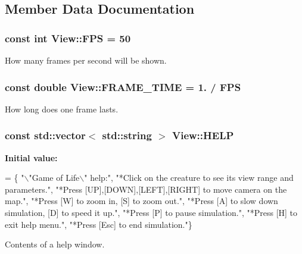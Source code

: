\subsection{Member Data Documentation}
\hypertarget{class_view_ac4811bd9d7b2887fb16bbc182338f2ce}{}
\subsubsection[{F\+P\+S}]{\setlength{\rightskip}{0pt plus 5cm}const int View\+::\+F\+P\+S = 50\hspace{0.3cm}{\ttfamily [static]}}\label{class_view_ac4811bd9d7b2887fb16bbc182338f2ce}
How many frames per second will be shown. \hypertarget{class_view_ae3addf8d83b08604be5ccfb8e5736c81}{}
\subsubsection[{F\+R\+A\+M\+E\+\_\+\+T\+I\+M\+E}]{\setlength{\rightskip}{0pt plus 5cm}const double View\+::\+F\+R\+A\+M\+E\+\_\+\+T\+I\+M\+E = 1. / {\bf F\+P\+S}\hspace{0.3cm}{\ttfamily [static]}}\label{class_view_ae3addf8d83b08604be5ccfb8e5736c81}
How long does one frame lasts. \hypertarget{class_view_ad5ede1942eee21c13e7bfeda1c6d9801}{}
\subsubsection[{H\+E\+L\+P}]{\setlength{\rightskip}{0pt plus 5cm}const std\+::vector$<$ std\+::string $>$ View\+::\+H\+E\+L\+P\hspace{0.3cm}{\ttfamily [static]}}\label{class_view_ad5ede1942eee21c13e7bfeda1c6d9801}
{\bfseries Initial value\+:}
\begin{DoxyCode}
= \{ \textcolor{stringliteral}{"\(\backslash\)"Game of Life\(\backslash\)" help:"},
                                     \textcolor{stringliteral}{"*Click on the creature to see its view range and parameters."},
                                     \textcolor{stringliteral}{"*Press [UP],[DOWN],[LEFT],[RIGHT] to move camera on the map."},
                                     \textcolor{stringliteral}{"*Press [W] to zoom in, [S] to zoom out."},
                                     \textcolor{stringliteral}{"*Press [A] to slow down simulation, [D] to speed it up."},
                                     \textcolor{stringliteral}{"*Press [P] to pause simulation."},
                                     \textcolor{stringliteral}{"*Press [H] to exit help menu."},
                                     \textcolor{stringliteral}{"*Press [Esc] to end simulation."}\}
\end{DoxyCode}
Contents of a help window. \hypertarget{class_view_a27d60d1f32f4f86745aedd73eecaaece}{}
